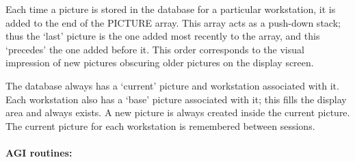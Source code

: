 Each time a picture is stored in the database for a particular workstation,
it is added to the end of the PICTURE array.
This array acts as a push-down stack; thus the `last' picture is the one added
most recently to the array, and this `precedes' the one added before it.
This order corresponds to the visual impression of new pictures obscuring
older pictures on the display screen.

The database always has a `current' picture and workstation associated with it.
Each workstation also has a `base' picture associated with it; this fills the
display area and always exists.
A new picture is always created inside the current picture.
The current picture for each workstation is remembered between sessions.

\paragraph{AGI routines:}\hfill
{}

